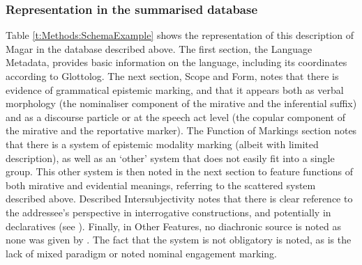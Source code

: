 \subsubsection{Representation in the summarised database}
Table \ref{t:Methods:SchemaExample} shows the representation of this description of Magar in the database described above. The first section, the Language Metadata, provides basic information on the language, including its coordinates according to Glottolog. The next section, Scope and Form, notes that there is evidence of grammatical epistemic marking, and that it appears both as verbal morphology (the nominaliser component of the mirative and the inferential suffix) and as a discourse particle or at the speech act level (the copular component of the mirative and the reportative marker). The Function of Markings section notes that there is a system of epistemic modality marking (albeit with limited description), as well as an `other' system that does not easily fit into a single group. This other system is then noted in the next section to feature functions of both mirative and evidential meanings, referring to the scattered system described above. Described Intersubjectivity notes that there is clear reference to the addressee's perspective in interrogative constructions, and potentially in declaratives (see ). Finally, in Other Features, no diachronic source is noted as none was given by . The fact that the system is not obligatory is noted, as is the lack of mixed paradigm or noted nominal engagement marking.
